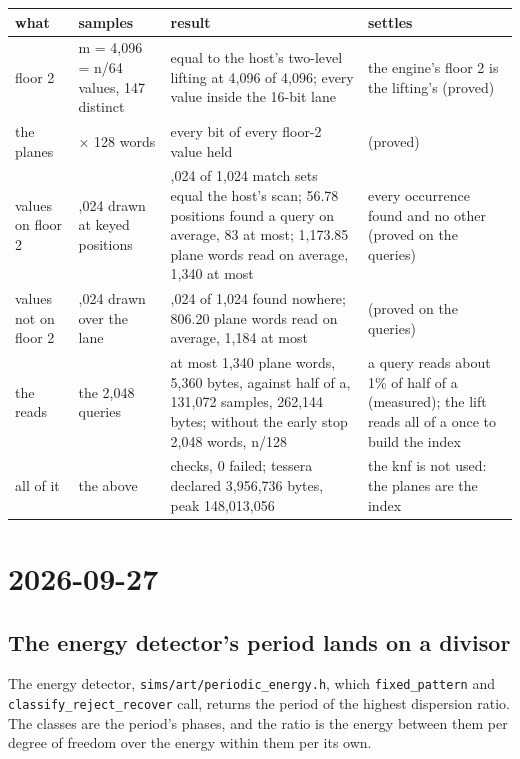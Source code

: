 {\footnotesize
\setlength{\tabcolsep}{6pt}
\begin{longtable}{>{\RaggedRight\arraybackslash}p{}>{\RaggedRight\arraybackslash}p{}>{\RaggedRight\arraybackslash}p{}>{\RaggedRight\arraybackslash}p{}}
\toprule
what & samples & result & settles \\
\midrule
\endhead
floor 2 & m = 4,096 = n/64 values, 147 distinct & equal to the host's two-level lifting at 4,096 of 4,096; every value inside the 16-bit lane & the engine's floor 2 is the lifting's (proved) \\
the planes & 16 × 128 words & every bit of every floor-2 value held & (proved) \\
values on floor 2 & 1,024 drawn at keyed positions & 1,024 of 1,024 match sets equal the host's scan; 56.78 positions found a query on average, 83 at most; 1,173.85 plane words read on average, 1,340 at most & every occurrence found and no other (proved on the queries) \\
values not on floor 2 & 1,024 drawn over the lane & 1,024 of 1,024 found nowhere; 806.20 plane words read on average, 1,184 at most & (proved on the queries) \\
the reads & the 2,048 queries & at most 1,340 plane words, 5,360 bytes, against half of a, 131,072 samples, 262,144 bytes; without the early stop 2,048 words, n/128 & a query reads about 1\% of half of a (measured); the lift reads all of a once to build the index \\
all of it & the above & 11 checks, 0 failed; tessera declared 3,956,736 bytes, peak 148,013,056 & the knf is not used: the planes are the index \\
\bottomrule
\end{longtable}
}

\section{\texorpdfstring{2026-09-27}{2026-09-27}}

\subsection{\texorpdfstring{The energy detector's period lands on a divisor}{The energy detector's period lands on a divisor}}

The energy detector, \texttt{sims/\allowbreak{}art/\allowbreak{}periodic\_\allowbreak{}energy.\allowbreak{}h}, which \texttt{fixed\_\allowbreak{}pattern} and \texttt{classify\_\allowbreak{}reject\_\allowbreak{}recover} call, returns the period of the highest dispersion ratio. The classes are the period's phases, and the ratio is the energy between them per degree of freedom over the energy within them per its own.

